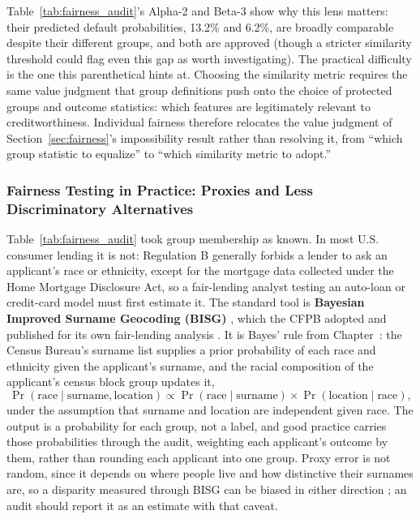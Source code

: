 \documentclass[../ai_in_finance]{subfiles}
\begin{document}
Table~\ref{tab:fairness_audit}'s Alpha-2 and Beta-3 show why this lens matters: their predicted default probabilities, 13.2\% and 6.2\%, are broadly comparable despite their different groups, and both are approved (though a stricter similarity threshold could flag even this gap as worth investigating). The practical difficulty is the one this parenthetical hints at. Choosing the similarity metric requires the same value judgment that group definitions push onto the choice of protected groups and outcome statistics: which features are legitimately relevant to creditworthiness. Individual fairness therefore relocates the value judgment of Section~\ref{sec:fairness}'s impossibility result rather than resolving it, from ``which group statistic to equalize'' to ``which similarity metric to adopt.''

\subsubsection*{Fairness Testing in Practice: Proxies and Less Discriminatory Alternatives}

Table~\ref{tab:fairness_audit} took group membership as known. In most U.S. consumer lending it is not: Regulation B generally forbids a lender to ask an applicant's race or ethnicity, except for the mortgage data collected under the Home Mortgage Disclosure Act, so a fair-lending analyst testing an auto-loan or credit-card model must first estimate it. The standard tool is \textbf{Bayesian Improved Surname Geocoding (BISG)} \parencite{elliott2009using}, which the CFPB adopted and published for its own fair-lending analysis \parencite{cfpb2014using}. It is Bayes' rule from Chapter~: the Census Bureau's surname list supplies a prior probability of each race and ethnicity given the applicant's surname, and the racial composition of the applicant's census block group updates it,
$$\Pr(\text{race} \mid \text{surname}, \text{location}) \propto \Pr(\text{race} \mid \text{surname}) \times \Pr(\text{location} \mid \text{race}),$$
under the assumption that surname and location are independent given race. The output is a probability for each group, not a label, and good practice carries those probabilities through the audit, weighting each applicant's outcome by them, rather than rounding each applicant into one group. Proxy error is not random, since it depends on where people live and how distinctive their surnames are, so a disparity measured through BISG can be biased in either direction \parencite{chen2019fairness}; an audit should report it as an estimate with that caveat.
\end{document}
